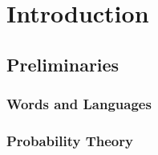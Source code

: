 \chapter{Introduction}

\section{Preliminaries}

\subsection{Words and Languages}

\subsection{Probability Theory}

